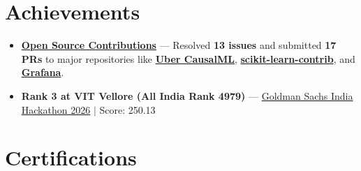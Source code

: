 \documentclass[a4paper,10pt]{article}
\newcommand{\ulink}[2]{\href{#1}{#2}}
\begin{document}
\section{Achievements}
\vspace{2pt}

\begin{itemize}[nosep, leftmargin=1.5em, itemsep=2pt, topsep=2pt]
  \item {\color[HTML]{0A0A0A}\fontsize{11}{14}\selectfont \textbf{\ulink{https://github.com/su-jin1425/My-Open-Source-Contributions}{Open Source Contributions}} --- Resolved \textbf{13 issues} and submitted \textbf{17 PRs} to major repositories like \ulink{https://github.com/uber/causalml}{\textbf{Uber CausalML}}, \ulink{https://github.com/scikit-learn-contrib/forest-confidence-interval}{\textbf{scikit-learn-contrib}}, and \ulink{https://github.com/grafana/alloy-scenarios}{\textbf{Grafana}}.}
  \item {\color[HTML]{0A0A0A}\fontsize{11}{14}\selectfont \textbf{Rank 3 at VIT Vellore (All India Rank 4979)} --- \ulink{https://www.hackerrank.com/contests/goldman-sachs-india-hackathon-2026-cs/leaderboard}{Goldman Sachs India Hackathon 2026} $|$ Score: 250.13}
\end{itemize}

\section{Certifications}
\vspace{2pt}
\end{document}
